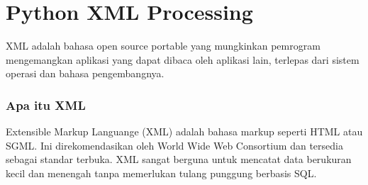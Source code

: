 

\section{Python XML Processing}
  XML adalah bahasa open source portable yang mungkinkan pemrogram mengemangkan aplikasi yang dapat dibaca oleh aplikasi lain, 
terlepas dari sistem operasi dan bahasa pengembangnya.
\subsubsection{Apa itu XML}
  Extensible Markup Languange (XML) adalah bahasa markup seperti HTML atau SGML. 
Ini direkomendasikan oleh World Wide Web Consortium dan tersedia sebagai standar terbuka.
XML sangat berguna untuk mencatat data berukuran kecil dan menengah tanpa memerlukan tulang punggung berbasis SQL. 



